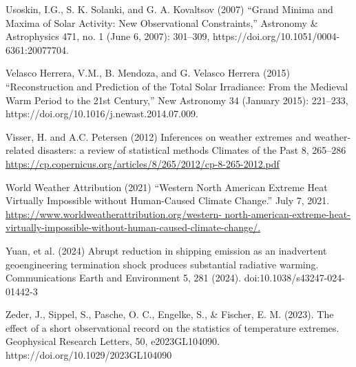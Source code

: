 \documentclass[12pt,paper=a4,DIV=12,parskip=never,chapterprefix=false,headings=standardclasses]{scrreprt}
\begin{document}
Usoskin, I.G., S. K. Solanki, and G. A. Kovaltsov (2007) “Grand Minima and Maxima of Solar Activity:
New Observational Constraints,” Astronomy \& Astrophysics 471, no. 1 (June 6, 2007): 301–309,
https://doi.org/10.1051/0004-6361:20077704.

Velasco Herrera, V.M., B. Mendoza, and G. Velasco Herrera (2015) “Reconstruction and Prediction of
the Total Solar Irradiance: From the Medieval Warm Period to the 21st Century,” New Astronomy 34
(January 2015): 221–233, https://doi.org/10.1016/j.newast.2014.07.009.

Visser, H. and A.C. Petersen (2012) Inferences on weather extremes and weather-related disasters: a
review of statistical methods Climates of the Past 8, 265–286
\url{https://cp.copernicus.org/articles/8/265/2012/cp-8-265-2012.pdf}

World Weather Attribution (2021) “Western North American Extreme Heat Virtually Impossible without
Human-Caused Climate Change.” July 7, 2021. \url{https://www.worldweatherattribution.org/western-
north-american-extreme-heat-virtually-impossible-without-human-caused-climate-change/.}

Yuan, et al. (2024) Abrupt reduction in shipping emission as an inadvertent geoengineering termination
shock produces substantial radiative warming. Communications Earth and Environment 5, 281
(2024). doi:10.1038/s43247-024-01442-3

Zeder, J., Sippel, S., Pasche, O. C., Engelke, S., \& Fischer, E. M. (2023). The effect of a short
observational record on the statistics of temperature extremes. Geophysical Research Letters, 50,
e2023GL104090. https://doi.org/10.1029/2023GL104090
\endgroup
\end{document}
